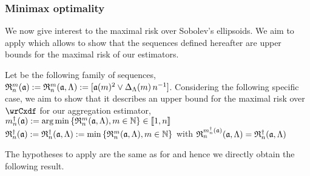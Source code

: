 \subsubsection{Minimax optimality}
We now give interest to the maximal risk over Sobolev's ellipsoids.
We aim to apply  which allows to show that the sequences defined hereafter are upper bounds for the maximal risk of our estimators.
\begin{de*}
  Let be the following family of sequences,
  $\daRa{\Di}{(\xdfCw[])}:=\daRa{\Di}{(\xdfCw[],\Lambda)}:=[\xdfCw^2\vee \DipenSv\,\ssY^{-1}]$.
Considering the following specific case, we aim to show that it describes an upper bound for the maximal risk over $\rwCxdf$ for our aggregation estimator,
    $\aDi{\ssY}(\xdfCw[]):=\argmin\Nset[\Di\in\Nz]{\daRa{\Di}{(\xdfCw[],\Lambda)}}\in\nset{1,\ssY}$\\
    $\naRa{(\xdfCw[])}:=\naRa{(\xdfCw[],\Lambda)}:=\min\Nset[\Di\in\Nz]{\daRa{\Di}{(\xdfCw[],\Lambda)}}$
    with $\daRa{\aDi{\ssY}(\xdfCw[])}{(\xdfCw[],\Lambda)}=\naRa{(\xdfCw[],\Lambda)}$
\assEnd
\end{de*}

The hypotheses to apply  are the same as for  and hence we directly obtain the following result.

